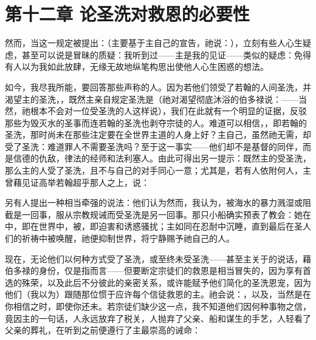 
\section{第十二章 论圣洗对救恩的必要性}

然而，当这一规定被提出：（主要基于主自己的宣告，祂说：），立刻有些人心生疑虑，甚至可以说是冒昧的质疑：我听到过——主是我的见证——类似的疑虑：免得有人以为我如此放肆，无缘无故地纵笔构思出使他人心生困惑的想法。\par

如今，我尽我所能，要回答那些声称的人。因为若他们领受了若翰的人间圣洗，并渴望主的圣洗，，既然主亲自规定圣洗是（祂对渴望彻底沐浴的伯多禄说：——当然，祂根本不会对一位受圣洗的人这样说），我们在此就有一个明显的证据，反驳那些为毁灭水的圣事而连若翰的圣洗也剥夺宗徒的人。难道可以相信，，即若翰的圣洗，那时尚未在那些注定要在全世界主道的人身上好？主自己，虽然祂无需，却受了圣洗：难道罪人不需要圣洗吗？至于这一事实——他们却不是基督的同伴，而是信德的仇敌，律法的经师和法利塞人。由此可得出另一提示：既然主的受圣洗，那么主的人受了圣洗，且不与自己的对手同心一意；尤其是，若有人依附何人，主曾藉见证高举若翰超乎那人之上，说：\par

另有人提出一种相当牵强的说法：他们认为然而，我认为，被海水的暴力溅湿或阻截是一回事，服从宗教规诫而受圣洗是另一回事。那只小船确实预表了教会：她在中，即在世界中，被，即迫害和诱惑骚扰；主如同在忍耐中沉睡，直到最后在圣人们的祈祷中被唤醒，祂便抑制世界，将宁静赐予祂自己的人。\par

现在，无论他们以何种方式受了圣洗，或至终未受圣洗——甚至主关于的说话，藉伯多禄的身份，仅是指而言——但要断定宗徒们的救恩是相当冒失的，因为享有首选的殊荣，以及此后不分彼此的亲密关系，或许能赋予他们简化的圣洗恩宠，因为他们（我以为）跟随那位惯于应许每个信徒救恩的主。祂会说：，以及，当然是在你相信之时，即使你还未。若宗徒们缺少这一点，我不知道他们因何种事物之信，竟因主的一句话，人永远放弃了税关，人抛弃了父亲、船和谋生的手艺，人轻看了父亲的葬礼，在听到之前便遵行了主最崇高的诫命：\par

